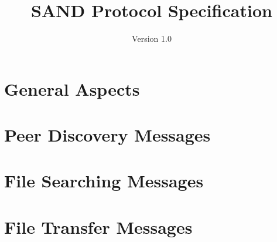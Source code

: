 \documentclass{article}
\title{\textbf{SAND Protocol Specification}}
\author{Version 1.0}
\date{}
\begin{document}
\maketitle

\section{General Aspects}
    
    
\section{Peer Discovery Messages}
    

\section{File Searching Messages}
    

\section{File Transfer Messages}
    
\end{document}
